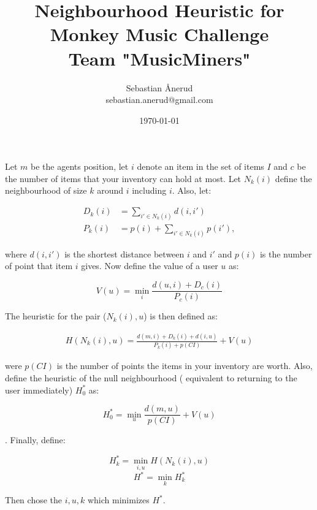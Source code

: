 \documentclass[11pt]{article}
\begin{document}
\title{Neighbourhood Heuristic for Monkey Music Challenge \\ Team "MusicMiners"}
\author{Sebastian Ånerud \\
		sebastian.anerud@gmail.com}
\date{\today}
\maketitle

\begin{flushleft}

Let $m$ be the agents position, let $i$ denote an item in the set of items $I$ and $c$ be the number of items that your inventory can hold at most. Let $N_k(i)$ define the neighbourhood of size $k$ around $i$ including $i$. Also, let:

\begin{align*}
D_k(i) &= \sum\limits_{i'\in N_k(i)} d(i,i') \\
P_k(i) &= p(i) + \sum\limits_{i'\in N_k(i)} p(i'),
\end{align*}

where $d(i,i')$ is the shortest distance between $i$ and $i'$ and $p(i)$ is the number of point that item $i$ gives. Now define the value of a user $u$ as:

$$V(u) = \min\limits_{i} \frac{d(u,i) + D_c(i)}{P_c(i)}$$

The heuristic for the pair ($N_k(i), u$) is then defined as:

\begin{align*}
H(N_k(i),u) = \frac{d(m,i) + D_k(i) + d(i,u)}{P_k(i) + p(CI)} + V(u)
\end{align*}

were $p(CI)$ is the number of points the items in your inventory are worth. Also, define the heuristic of the null neighbourhood ( equivalent to returning to the user immediately) $H^*_0$ as:

$$H^*_0 = \min\limits_{u} \frac{d(m,u)}{p(CI)} + V(u)$$

. Finally, define:

$$H_k^* = \min\limits_{i,u} H(N_k(i),u)$$
$$H^* = \min\limits_{k} H_k^*$$

Then chose the $i,u,k$ which minimizes $H^*$.
\end{flushleft}
\end{document}
